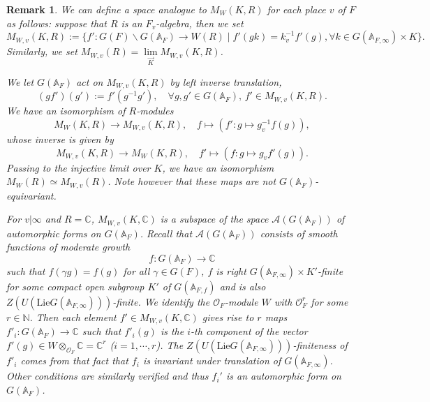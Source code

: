 \documentclass[12pt,oneside,reqno]{amsart}
\newcommand{\A}{\mathbb{A}}
\newcommand{\Ocal}{\mathcal{O}}
\theoremstyle{plain}
\newtheorem{remark}[theorem]{Remark}
\begin{document}
	\begin{remark}\label{equivalence of various spaces of modular forms}\rm 
		We can define a space analogue to $M_W(K,R)$ for each place $v$ of $F$ as follows: suppose that $R$ is an $F_v$-algebra,
		then we set
		\[
		M_{W,v}(K,R)
		:=
		\{
		f'\colon
		G(F)\backslash G(\mathbb{A}_F)
		\rightarrow
		W(R)\mid 
		f'(gk)=k_v^{-1}f'(g),
		\forall
		k\in
		G(\mathbb{A}_{F,\infty})\times K
		\}.
		\]
		Similarly, we set
		$M_{W,v}(R)=
		\lim\limits_{\overrightarrow{K}}
		M_{W,v}(K,R)$.
		
		
		
		
		
		
		We let $G(\mathbb{A}_F)$ act on $M_{W,v}(K,R)$ by \emph{left inverse} translation,
		\[
		(gf')(g')
		:=
		f'(g^{-1}g'),
		\quad
		\forall
		g,g'\in G(\mathbb{A}_F),
		\,
		f'\in M_{W,v}(K,R).
		\]
		We have an isomorphism of $R$-modules
		\[
		M_W(K,R)
		\rightarrow
		M_{W,v}(K,R),
		\quad
		f
		\mapsto
		(
		f'\colon
		g\mapsto
		g_v^{-1}f(g)
		),
		\]
		whose inverse is given by
		\[
		M_{W,v}(K,R)
		\rightarrow
		M_W(K,R),
		\quad
		f'\mapsto
		(
		f\colon
		g\mapsto
		g_vf'(g)
		).
		\]
		Passing to the injective limit over $K$, we have an isomorphism	$M_W(R)\simeq M_{W,v}(R)$. Note however that these maps are not
		$G(\mathbb{A}_F)$-equivariant.
		
		
		
		
		
		
		
		
		For $v|\infty$ and $R=\mathbb{C}$, $M_{W,v}(K,\mathbb{C})$ is a subspace of the space $\mathcal{A}(G(\mathbb{A}_F))$ of automorphic forms on
		$G(\mathbb{A}_F)$. Recall that $\mathcal{A}(G(\A_F))$ consists of smooth functions of moderate growth
		\[
		f\colon G(\mathbb{A}_F)\rightarrow\mathbb{C}
		\]
		such that $f(\gamma g)=f(g)$ for all $\gamma\in G(F)$, $f$ is right $G(\mathbb{A}_{F,\infty})\times K'$-finite for some compact open subgroup
		$K'$ of $G(\mathbb{A}_{F,f})$ and is also	$Z(U(\mathrm{Lie}G(\mathbb{A}_{F,\infty})))$-finite. We identify the $\Ocal_F$-module $W$ with $\mathcal{O}_F^r$ for some $r\in\mathbb{N}$. Then each element
		$f'\in M_{W,v}(K,\mathbb{C})$ gives rise to $r$ maps
		$f'_i\colon G(\mathbb{A}_F)\rightarrow\mathbb{C}$ such that $f'_i(g)$
		is the $i$-th component of the vector $f'(g)\in W\otimes_{\mathcal{O}_F}\mathbb{C}=\mathbb{C}^r$ ($i=1,\cdots,r$).
		The $Z(U(\mathrm{Lie}G(\mathbb{A}_{F,\infty})))$-finiteness of $f'_i$ comes from that fact that $f_i$ is invariant under translation of $G(\mathbb{A}_{F,\infty})$. Other conditions are similarly verified and thus
		$f_i'$ is an automorphic form on $G(\mathbb{A}_F)$.
	\end{remark}
	
\end{document}
